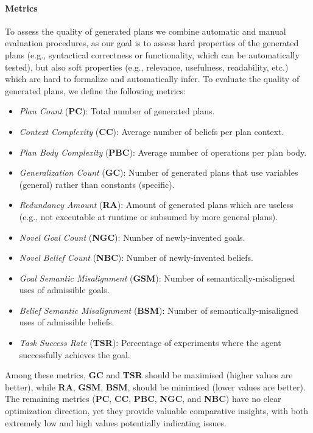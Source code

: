 \paragraph{Metrics}
To assess the quality of generated plans
we combine automatic and manual evaluation procedures,
as our goal is to assess hard properties of the generated plans
(e.g., syntactical correctness or functionality, which can be automatically tested),
but also soft properties (e.g., relevance, usefulness, readability, etc.) 
which are hard to formalize and automatically infer.
%
To evaluate the quality of generated plans, we define the following metrics:
\newcommand{\PC}{\textbf{PC}}
\newcommand{\CC}{\textbf{CC}}
\newcommand{\PBC}{\textbf{PBC}}
\newcommand{\GR}{\textbf{GC}}
\newcommand{\RA}{\textbf{RA}}
\newcommand{\NGC}{\textbf{NGC}}
\newcommand{\NBC}{\textbf{NBC}}
\newcommand{\GSM}{\textbf{GSM}}
\newcommand{\BSM}{\textbf{BSM}}
\newcommand{\TSR}{\textbf{TSR}}
\newcommand{\GAT}{\textbf{GAT}}
\newcommand{\PRAS}{\textbf{PRAS}}
\begin{itemize}
    \item \emph{Plan Count} (\PC): Total number of generated plans.
    \item \emph{Context Complexity} (\CC): Average number of beliefs per plan context.
    \item \emph{Plan Body Complexity} (\PBC): Average number of operations per plan body.
    \item \emph{Generalization Count} (\GR): Number of generated plans that use variables (general) rather than constants (specific).
     \item \emph{Redundancy Amount} (\RA): Amount of generated plans which are useless (e.g., not executable at runtime or subsumed by more general plans).
    \item \emph{Novel Goal Count} (\NGC): Number of newly-invented goals.
    \item \emph{Novel Belief Count} (\NBC): Number of newly-invented beliefs.
    \item \emph{Goal Semantic Misalignment} (\GSM): Number of semantically-misaligned uses of admissible goals.
    \item \emph{Belief Semantic Misalignment} (\BSM): Number of semantically-misaligned uses of admissible beliefs.
    \item \emph{Task Success Rate} (\TSR): Percentage of experiments where the agent successfully achieves the  goal.
\end{itemize}
Among these metrics,
\GR{} and \TSR{} should be maximised (higher values are better),
while \RA{}, \GSM{}, \BSM{}, should be minimised (lower values are better).
%
The remaining metrics (\PC{}, \CC{}, \PBC{}, \NGC{}, and \NBC{}) have no clear optimization direction,
yet they provide valuable comparative insights, with both extremely low and high values potentially indicating issues.


